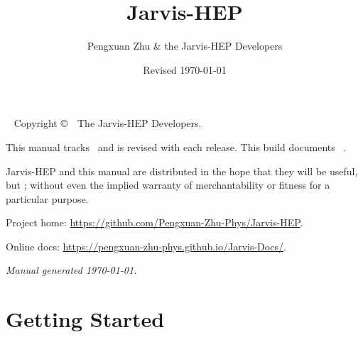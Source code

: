 \documentclass[symmetric,openany,nobib]{tufte-book}
\title{Jarvis-HEP}
\author{Pengxuan Zhu \& the Jarvis-HEP Developers}
\date{Revised \today}
\let\jorigpart\part
\renewcommand{\part}{\cleardoublepage\jorigpart}
\begin{document}
\frontmatter

\maketitle

\newpage
\begin{fullwidth}
~\vfill
\thispagestyle{empty}
\setlength{\parindent}{0pt}
\setlength{\parskip}{\baselineskip}
\noindent Copyright \copyright\ \the\year\ The Jarvis-HEP Developers.

\par This manual tracks \Jarvis\ and is revised with each release. This build documents
\Jarvis\ \Jversion.

\par{}  Jarvis-HEP and this manual are
distributed in the hope that they will be useful, but ; without even the implied warranty of merchantability or fitness for a
particular purpose.

\par Project home: \url{https://github.com/Pengxuan-Zhu-Phys/Jarvis-HEP}.
\par Online docs: \url{https://pengxuan-zhu-phys.github.io/Jarvis-Docs/}.

\par\textit{Manual generated \today.}
\end{fullwidth}

\tableofcontents
\listoffigures
\listoftables

\cleardoublepage


\mainmatter
\renewcommand{\chaptermark}[1]{\markboth{\thechapter.\ #1}{}}

\part{Getting Started}\label{part:getting-started}




\end{document}
